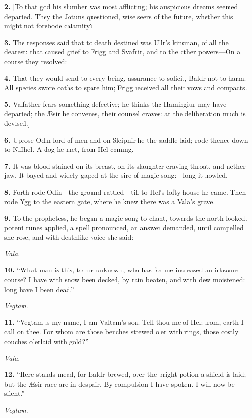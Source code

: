 \textbf{2.} [To that god his slumber was most afflicting; his auspicious
dreams seemed departed. They the Jötuns questioned, wise seers of the
future, whether this might not forebode calamity?

\textbf{3.} The responses said that to death destined was Ullr's kinsman, of
all the dearest: that caused grief to Frigg and Svafnir, and to the
other powers—On a course they resolved:

\textbf{4.} That they would send to every being, assurance to solicit, Baldr
not to harm. All species swore oaths to spare him; Frigg received all
their vows and compacts.

\textbf{5.} Valfather fears something defective; he thinks the Hamingiur may
have departed; the Æsir he convenes, their counsel craves: at the
deliberation much is devised.]

\textbf{6.} Uprose Odin lord of men and on Sleipnir he the saddle laid; rode
thence down to Niflhel. A dog he met, from Hel coming.

\textbf{7.} It was blood-stained on its breast, on its slaughter-craving
throat, and nether jaw. It bayed and widely gaped at the sire of magic
song:—long it howled.

\textbf{8.} Forth rode Odin—the ground rattled—till to Hel's lofty house he
came. Then rode Ygg to the eastern gate, where he knew there was a
Vala's grave.

\textbf{9.} To the prophetess, he began a magic song to chant, towards the
north looked, potent runes applied, a spell pronounced, an answer
demanded, until compelled she rose, and with deathlike voice she said:

\emph{Vala}.

\textbf{10.} ``What man is this, to me unknown, who has for me increased an
irksome course? I have with snow been decked, by rain beaten, and with
dew moistened: long have I been dead.''

\emph{Vegtam}.

\textbf{11.} ``Vegtam is my name, I am Valtam's son. Tell thou me of Hel:
from, earth I call on thee. For whom are those benches strewed o'er
with rings, those costly couches o'erlaid with gold?''

\emph{Vala}.

\textbf{12.} ``Here stands mead, for Baldr brewed, over the bright potion a
shield is laid; but the Æsir race are in despair. By compulsion I have
spoken. I will now be silent.''

\emph{Vegtam}.


